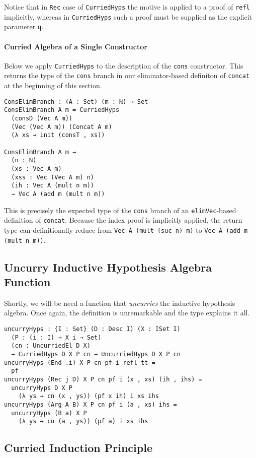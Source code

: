 \documentclass[preprint,nonatbib]{sigplanconf}
\begin{document}
Notice that in
{\tt Rec} case of {\tt CurriedHyps} the motive is applied to a proof
of {\tt refl} implicitly, whereas in {\tt CurriedHyps} such a proof
must be supplied as the explicit parameter {\tt q}.

\paragraph{Curried Algebra of a Single Constructor}

Below we apply {\tt CurriedHyps} to the description of the
{\tt cons} constructor. This returns the type of the {\tt cons} branch
in our eliminator-based definiton of {\tt concat} at the
beginning of this section.

\begin{verbatim}
ConsElimBranch : (A : Set) (m : ℕ) → Set
ConsElimBranch A m = CurriedHyps
  (consD (Vec A m))
  (Vec (Vec A m)) (Concat A m)
  (λ xs → init (consT , xs))

ConsElimBranch A m ⇝
  (n : ℕ)
  (xs : Vec A m)
  (xss : Vec (Vec A m) n)
  (ih : Vec A (mult n m))
  → Vec A (add m (mult n m))
\end{verbatim}

This is precisely the expected type of the {\tt cons} branch of
an {\tt elimVec}-based definition of {\tt concat}. Because the index
proof is implicitly applied, the return type can definitionally
reduce from {\tt Vec A (mult (suc n) m)}
to {\tt Vec A (add m (mult n m))}.

\subsection{Uncurry Inductive Hypothesis Algebra Function}

Shortly, we will be need a function that {\it uncurries} the inductive
hypothesis algebra. Once again, the definition is unremarkable and the
type explains it all.

\begin{verbatim}
uncurryHyps : {I : Set} (D : Desc I) (X : ISet I)
  (P : (i : I) → X i → Set)
  (cn : UncurriedEl D X)
  → CurriedHyps D X P cn → UncurriedHyps D X P cn
uncurryHyps (End .i) X P cn pf i refl tt =
  pf
uncurryHyps (Rec j D) X P cn pf i (x , xs) (ih , ihs) =
  uncurryHyps D X P
    (λ ys → cn (x , ys)) (pf x ih) i xs ihs
uncurryHyps (Arg A B) X P cn pf i (a , xs) ihs =
  uncurryHyps (B a) X P
    (λ ys → cn (a , ys)) (pf a) i xs ihs
\end{verbatim}

\subsection{Curried Induction Principle}
\end{document}
